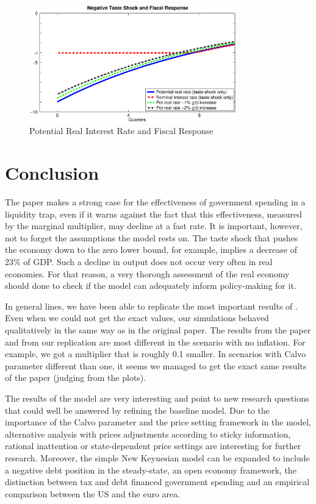 \documentclass[12pt,a4paper,oneside,titlepage]{article}
\begin{document}
\begin{figure}[!th]
\centering
\includegraphics[width=0.8\textwidth]{Paperpics/Figure1a}
\caption{Potential Real Interest Rate and Fiscal Response}
\label{Figure1a}
\end{figure}








\section{Conclusion}
The paper makes a strong case for the effectiveness of government spending in a liquidity trap, even if it warns against the fact that this effectiveness, measured by the marginal multiplier, may decline at a fast rate. It is important, however, not to forget the assumptions the model rests on. The taste shock that pushes the economy down to the zero lower bound, for example, implies a decrease of $23\%$ of GDP. Such a decline in output does not occur very often in real economies. For that reason, a very thorough assessment of the real economy should done to check if the model can adequately inform policy-making for it.
\par
\bigskip
In general lines, we have been able to replicate the most important results of \citet{Erceg.2014}. Even when we could not get the exact values, our simulations behaved qualitatively in the same way as in the original paper. The results from the paper and from our replication are most different in the scenario with no inflation. For example, we got a multiplier that is roughly 0.1 smaller. In scenarios with Calvo parameter different than one, it seems we managed to get the exact same results of the paper (judging from the plots).
\par
\bigskip
The results of the model are very interesting and point to new research questions that could well be answered by refining the baseline model. Due to the importance of the Calvo parameter and the price setting framework in the model, alternative analysis with prices adjustments according to sticky information, rational inattention or state-dependent price settings are interesting for further research. Moreover, the simple New Keynesian model can be expanded to include a negative debt position in the steady-state, an open economy framework, the distinction between tax and debt financed government spending and an empirical comparison between the US and the euro area.
\end{document}
